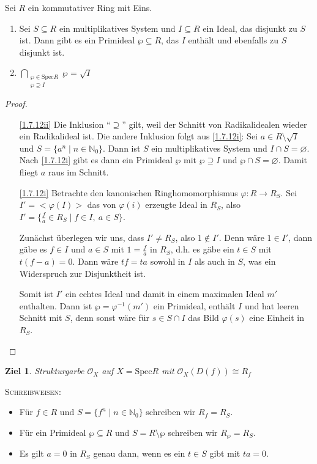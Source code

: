 \documentclass[a4paper,12pt]{scrbook}
\newtheorem{ziel}{Ziel}
\newtheorem{proof}{Beweis}
\def\O{\mathcal{O}}
\newcommand{\Spec}{\mathrm{Spec}}
\newcommand{\ra}{\longrightarrow}
\renewcommand{\phi}{\varphi}
\newcommand{\leer}{\ensuremath{\varnothing}}
\newcommand{\set}[1]{\ensuremath{\mathbb{#1}}}
\newcommand{\N}{\set{N}}
\begin{document}
\begin{lem}\label{1.7.12}
  Sei $R$ ein kommutativer Ring mit Eins.
  \begin{enumerate}
  \item{} Sei $S\subseteq R$ ein multiplikatives System und $I\subseteq R$ ein Ideal, das disjunkt zu $S$ ist. Dann
    gibt es ein Primideal $\wp\subseteq R$, das $I$ enthält und ebenfalls zu $S$ disjunkt ist.
  \item{} $\displaystyle\!\!\!\bigcap_{\substack{\wp\in\Spec R\\\wp\supseteq I}}\!\!\!\wp = \sqrt{I}$
  \end{enumerate}
\end{lem}
\begin{proof}
  \begin{enumerate}
  \item[\ref{1.7.12ii}] Die Inklusion \enquote{$\supseteq$} gilt, weil der Schnitt von Radikalidealen wieder ein Radikalideal
    ist. Die andere Inklusion folgt aus \ref{1.7.12i}: Sei $a\in R\setminus\sqrt{I}$ und $S=\{a^n\mid n\in\N_0\}$. Dann ist $S$
    ein multiplikatives System und $I\cap S=\leer$. Nach \ref{1.7.12i} gibt es dann ein Primideal $\wp$ mit $\wp\supseteq I$ und
    $\wp\cap S=\leer$. Damit fliegt $a$ raus im Schnitt.
  \item[\ref{1.7.12i}] Betrachte den kanonischen Ringhomomorphismus $\phi\colon R\ra R_S$. Sei $I'=<\phi(I)>$ das von $\phi(i)$
    erzeugte Ideal in $R_S$, also $I'=\{\frac{f}{a}\in R_S\mid f\in I,\ a\in S\}$.

    Zunächst überlegen wir uns, dass $I'\neq R_S$, also $1\notin I'$. Denn wäre $1\in I'$, dann gäbe es $f\in I$ und $a\in S$
    mit $1=\frac{f}{a}$ in $R_S$, d.h. es gäbe ein $t\in S$ mit $t(f-a)=0$. Dann wäre $tf=ta$ sowohl in $I$ als auch in $S$, was
    ein Widerspruch zur Disjunktheit ist.

    Somit ist $I'$ ein echtes Ideal und damit in einem maximalen Ideal $m'$ enthalten. Dann ist $\wp=\phi^{-1}(m')$ ein
    Primideal, enthält $I$ und hat leeren Schnitt mit $S$, denn sonst wäre für $s\in S\cap I$ das Bild $\phi(s)$ eine Einheit in
    $R_S$.
  \end{enumerate}
\end{proof}

\begin{ziel}
  Strukturgarbe $\O_X$ auf $X=\Spec R$ mit $\O_X(D(f))\cong R_f$
\end{ziel}

\textsc{Schreibweisen}:
\begin{itemize}
\item Für $f\in R$ und $S=\{f^n\mid n\in\N_0\}$ schreiben wir $R_f=R_S$.
\item Für ein Primideal $\wp\subseteq R$ und $S=R\setminus\wp$ schreiben wir $R_\wp=R_S$.
\item Es gilt $a=0$ in $R_S$ genau dann, wenn es ein $t\in S$ gibt mit $ta=0$.
\end{itemize}
\end{document}
